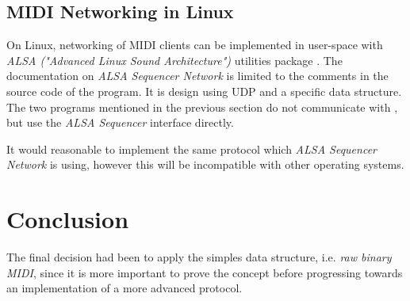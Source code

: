 \subsection{MIDI Networking in Linux}

  On Linux, networking of MIDI clients can be implemented in user-space
 with \emph{ALSA ("Advanced Linux Sound Architecture")} utilities package
 \cite{links:linux:alsa}.
 The documentation on \emph{ALSA Sequencer Network} is limited to the
 comments in the source code of the  program. It is design
 using UDP and a specific data structure. The two programs mentioned in
 the previous section do not communicate with , but use
 the \emph{ALSA Sequencer} interface directly.

  It would reasonable to implement the same protocol which \emph{ALSA
 Sequencer Network} is using, however this will be incompatible with
 other operating systems.

\section{Conclusion}

  The final decision had been to apply the simples data structure, i.e.
 \emph{raw binary MIDI}, since it is more important to prove the concept
 before progressing towards an implementation of a more advanced protocol.

